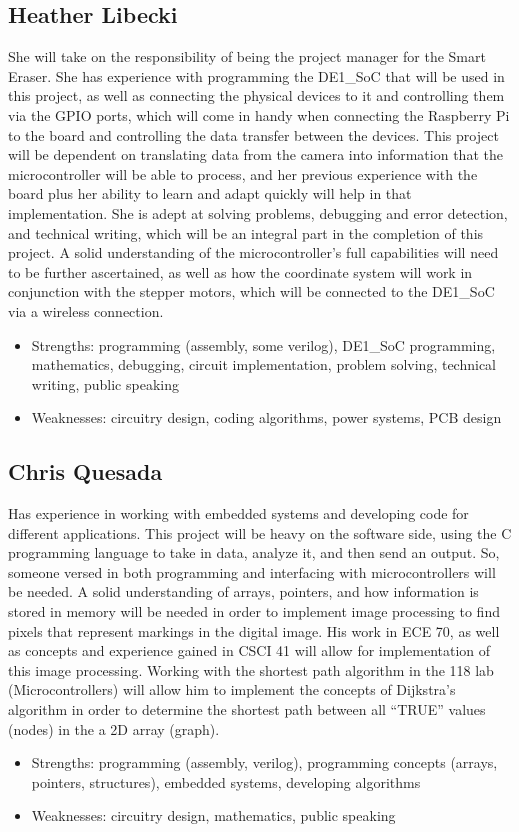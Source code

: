 \subsection{Heather Libecki}
She will take on the responsibility of being the project manager for the Smart Eraser. She has experience with programming the DE1\_SoC that will be used in this project, as well as connecting the physical devices to it and controlling them via the GPIO ports, which will come in handy when connecting the Raspberry Pi to the board and controlling the data transfer between the devices. This project will be dependent on translating data from the camera into information that the microcontroller will be able to process, and her previous experience with the board plus her ability to learn and adapt quickly will help in that implementation. She is adept at solving problems, debugging and error detection, and technical writing, which will be an integral part in the completion of this project. A solid understanding of the microcontroller’s full capabilities will need to be further ascertained, as well as how the coordinate system will work in conjunction with the stepper motors, which will be connected to the DE1\_SoC via a wireless connection.
\begin{itemize}
	\item Strengths: programming (assembly, some verilog), DE1\_SoC programming, mathematics, debugging, circuit implementation, problem solving, technical writing, public speaking\\
	\item Weaknesses: circuitry design, coding algorithms, power systems, PCB design \\ 
\end{itemize} 
 \subsection{Chris Quesada}
Has experience in working with embedded systems and developing code for different applications. This project will be heavy on the software side, using the C programming language to take in data, analyze it, and then send an output. So, someone versed in both programming and interfacing with microcontrollers will be needed. A solid understanding  of arrays, pointers, and how information is stored in memory will be needed in order to implement image processing to find pixels that represent markings in the digital image. His work in ECE 70, as well as concepts and experience gained in CSCI 41 will allow for implementation of this image processing. Working with the shortest path algorithm in the 118 lab (Microcontrollers) will allow him to implement the concepts of Dijkstra's algorithm in order to determine the shortest path between all “TRUE” values (nodes) in the a 2D array (graph).
\begin{itemize}
	\item Strengths: programming (assembly, verilog),  programming concepts (arrays, pointers, structures), embedded systems, developing algorithms
	
	\item Weaknesses:  circuitry design, mathematics, public speaking \\ 
\end{itemize} \par
